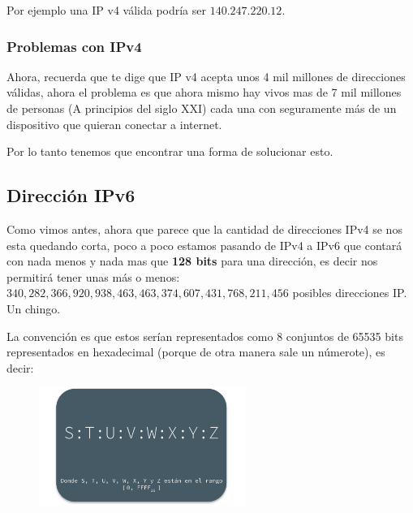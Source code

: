\documentclass[12pt, fleqn]{report}                             %
\theoremstyle{break}                                            %
\begin{document}
                Por ejemplo una IP v4 válida podría ser $140.247.220.12$. 


                \vspace{1.5em}
                \subsubsection{Problemas con IPv4}

                Ahora, recuerda que te dige que IP v4 acepta unos 4 mil millones de direcciones
                válidas, ahora el problema es que ahora mismo hay vivos mas de 7 mil millones
                de personas (A principios del siglo XXI) cada una con seguramente más de un
                dispositivo que quieran conectar a internet.

                Por lo tanto tenemos que encontrar una forma de solucionar esto.



            \clearpage
            \subsection{Dirección IPv6}

                Como vimos antes, ahora que parece que la cantidad de direcciones IPv4 se 
                nos esta quedando corta, poco a poco estamos pasando de IPv4 a IPv6 que contará
                con nada menos y nada mas que \textbf{128 bits} para una dirección, es decir
                nos permitirá tener unas más o menos: $340, 282, 366, 920, 938, 463, 463, 374, 607,
                431, 768, 211, 456$ posibles direcciones IP. Un chingo.

                La convención es que estos serían representados como 8 conjuntos de 65535 bits representados
                en hexadecimal (porque de otra manera sale un númerote), es decir:

                \begin{figure}[h]
                    \centering
                    \includegraphics[width=0.60\textwidth]{IPv6}
                \end{figure}
\end{document}
